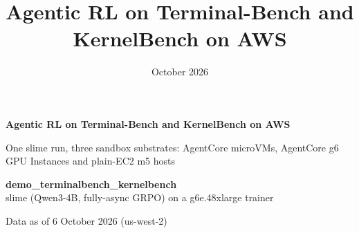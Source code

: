 
\renewcommand{\deckfooter}{demo\_terminalbench\_kernelbench $\cdot$ agentcore-project $\cdot$ October 2026}

\title{Agentic RL on Terminal-Bench and KernelBench on AWS}
\date{October 2026}



{
\begin{frame}[plain]
\vspace*{4mm}
\begin{minipage}{0.60\textwidth}\raggedright
{\fontsize{22}{26}\selectfont\bfseries\color{white}Agentic RL on Terminal-Bench and KernelBench on AWS\par}
\vspace{3mm}
{\raggedright\large\color{white}One slime run, three sandbox substrates: AgentCore microVMs, AgentCore g6 GPU Instances and plain-EC2 m5 hosts\par}
\vspace{8mm}
{\small\color{white}\textbf{demo\_terminalbench\_kernelbench}\\slime (Qwen3-4B, fully-async GRPO) on a g6e.48xlarge trainer\par}
\vspace{3mm}
{\scriptsize\color{inkmuted}Data as of 6 October 2026 (us-west-2)}
\end{minipage}
\end{frame}}

